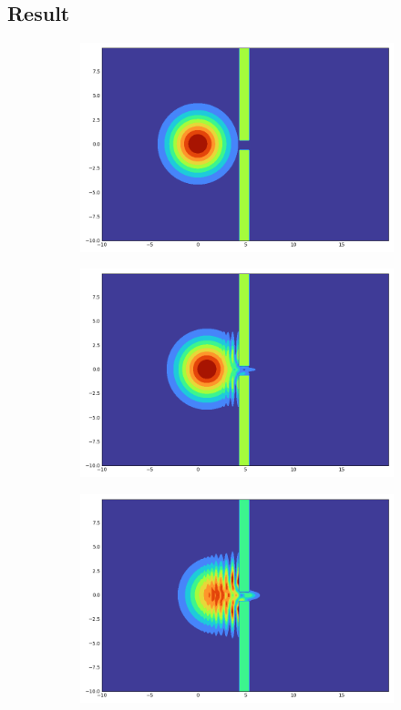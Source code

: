 \subsection{Result}
\begin{figure}[h!]
    \centering
    \begin{subfigure}{0.3\linewidth}
        \includegraphics[width=\linewidth]{10/0}
    \end{subfigure}
    \begin{subfigure}{0.3\linewidth}
        \includegraphics[width=\linewidth]{10/100}
    \end{subfigure}
    \begin{subfigure}{0.3\linewidth}
        \includegraphics[width=\linewidth]{10/200}

\end{subfigure}
\end{figure}
